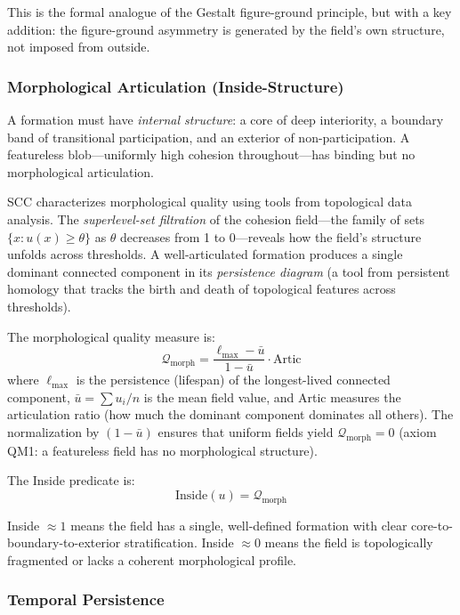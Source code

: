 \documentclass[lettersize,journal]{IEEEtran}
\begin{document}
This is the formal analogue of the Gestalt figure-ground principle, but with a key addition: the figure-ground asymmetry is generated by the field's own structure, not imposed from outside.

\subsubsection{Morphological Articulation (Inside-Structure)}

A formation must have \emph{internal structure}: a core of deep interiority, a boundary band of transitional participation, and an exterior of non-participation. A featureless blob---uniformly high cohesion throughout---has binding but no morphological articulation.

SCC characterizes morphological quality using tools from topological data analysis. The \emph{superlevel-set filtration} of the cohesion field---the family of sets $\{x : u(x) \geq \theta\}$ as $\theta$ decreases from 1 to 0---reveals how the field's structure unfolds across thresholds. A well-articulated formation produces a single dominant connected component in its \emph{persistence diagram} (a tool from persistent homology that tracks the birth and death of topological features across thresholds).

The morphological quality measure is:
\begin{equation}
\mathcal{Q}_{\mathrm{morph}} = \frac{\ell_{\max} - \bar{u}}{1 - \bar{u}} \cdot \text{Artic}
\end{equation}
where $\ell_{\max}$ is the persistence (lifespan) of the longest-lived connected component, $\bar{u} = \sum u_i / n$ is the mean field value, and Artic measures the articulation ratio (how much the dominant component dominates all others). The normalization by $(1 - \bar{u})$ ensures that uniform fields yield $\mathcal{Q}_{\mathrm{morph}} = 0$ (axiom QM1: a featureless field has no morphological structure).

The Inside predicate is:
\begin{equation}
\text{Inside}(u) = \mathcal{Q}_{\mathrm{morph}}
\end{equation}

Inside $\approx 1$ means the field has a single, well-defined formation with clear core-to-boundary-to-exterior stratification. Inside $\approx 0$ means the field is topologically fragmented or lacks a coherent morphological profile.

\subsubsection{Temporal Persistence}
\end{document}
